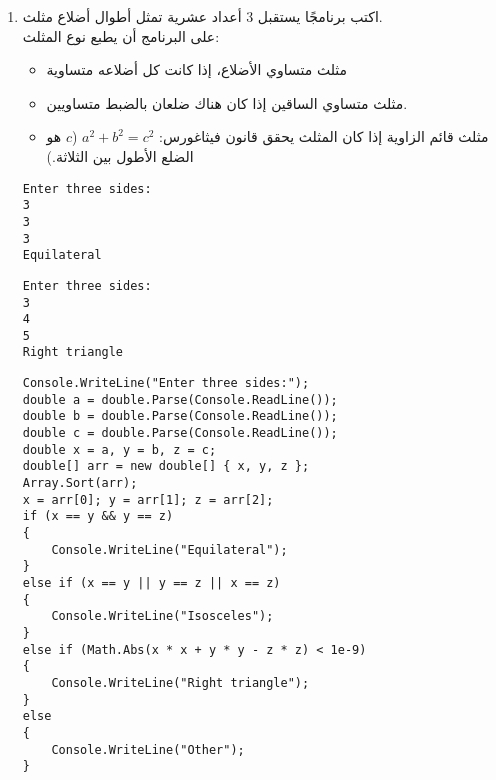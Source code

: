 ﻿\documentclass[12pt]{article}
\begin{document}
\begin{enumerate}[itemsep=3em]
\item
اكتب برنامجًا يستقبل 3 أعداد عشرية تمثل أطوال أضلاع مثلث. \\
على البرنامج أن يطبع نوع المثلث:
\begin{itemize}
    \item مثلث متساوي الأضلاع، إذا كانت كل أضلاعه متساوية
    \item مثلث متساوي الساقين إذا كان هناك ضلعان بالضبط متساويين.
    \item مثلث قائم الزاوية إذا كان المثلث يحقق قانون فيثاغورس: $a^2 + b^2 = c^2$ ($c$ هو الضلع الأطول بين الثلاثة.)
\end{itemize}
\ifdetailed
\begin{boxExample}[1]
\begin{english}
\begin{verbatim}
Enter three sides:
3
3
3
Equilateral
\end{verbatim}
\end{english}
\end{boxExample}
\begin{boxExample}[2]
\begin{english}
\begin{verbatim}
Enter three sides:
3
4
5
Right triangle
\end{verbatim}
\end{english}
\end{boxExample}
\fi
\ifwithsols
\begin{boxSolution}
\begin{english}
\begin{verbatim}
Console.WriteLine("Enter three sides:");
double a = double.Parse(Console.ReadLine());
double b = double.Parse(Console.ReadLine());
double c = double.Parse(Console.ReadLine());
double x = a, y = b, z = c;
double[] arr = new double[] { x, y, z };
Array.Sort(arr);
x = arr[0]; y = arr[1]; z = arr[2];
if (x == y && y == z)
{
    Console.WriteLine("Equilateral");
}
else if (x == y || y == z || x == z)
{
    Console.WriteLine("Isosceles");
}
else if (Math.Abs(x * x + y * y - z * z) < 1e-9)
{
    Console.WriteLine("Right triangle");
}
else
{
    Console.WriteLine("Other");
}
\end{verbatim}
\end{english}
\end{boxSolution}
\fi


\end{enumerate}
\end{document}
